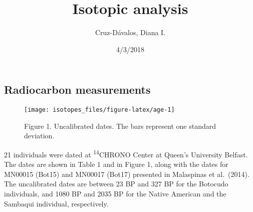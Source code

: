\documentclass[]{article}
\title{Isotopic analysis}
\author{Cruz-Dávalos, Diana I.}
\date{4/3/2018}
\begin{document}
\maketitle

\hypertarget{radiocarbon-measurements}{%
\subsection{Radiocarbon measurements}\label{radiocarbon-measurements}}

\begin{figure}
\texttt{[image: isotopes\_files/figure-latex/age-1]} \caption{\label{fig:age} Figure 1. Uncalibrated dates. The bars represent one standard deviation.}\label{fig:age}
\end{figure}

21 individuals were dated at \textsuperscript{14}CHRONO Center at
Queen's University Belfast. The dates are shown in Table 1 and in Figure
1, along with the dates for MN00015 (Bot15) and MN00017 (Bot17)
presented in Malaspinas et al.~(2014). The uncalibrated dates are
between 23 BP and 327 BP for the Botocudo individuals, and 1080 BP and
2035 BP for the Native American and the Sambaqui individual,
respectively.
\end{document}
